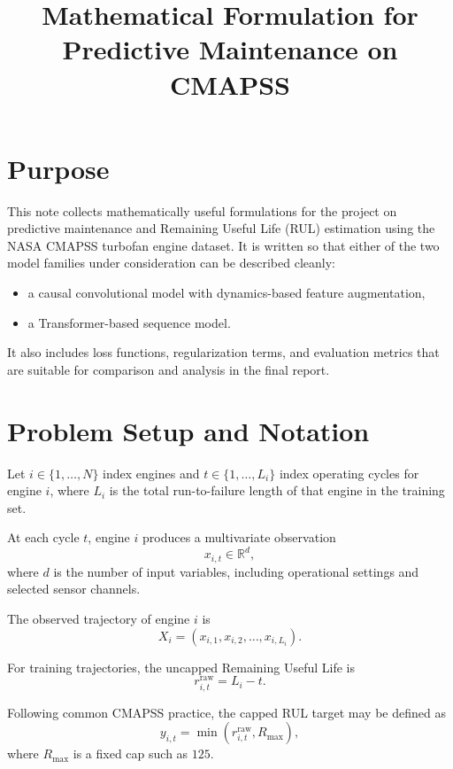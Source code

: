 \documentclass[11pt,a4paper]{article}
\title{Mathematical Formulation for Predictive Maintenance on CMAPSS}
\author{}
\date{}
\begin{document}
\maketitle

\section{Purpose}
This note collects mathematically useful formulations for the project on predictive maintenance and Remaining Useful Life (RUL) estimation using the NASA CMAPSS turbofan engine dataset. It is written so that either of the two model families under consideration can be described cleanly:
\begin{itemize}
    \item a causal convolutional model with dynamics-based feature augmentation,
    \item a Transformer-based sequence model.
\end{itemize}

It also includes loss functions, regularization terms, and evaluation metrics that are suitable for comparison and analysis in the final report.

\section{Problem Setup and Notation}
Let $i \in \{1,\dots,N\}$ index engines and $t \in \{1,\dots,L_i\}$ index operating cycles for engine $i$, where $L_i$ is the total run-to-failure length of that engine in the training set.

At each cycle $t$, engine $i$ produces a multivariate observation
\begin{equation}
    x_{i,t} \in \mathbb{R}^{d},
\end{equation}
where $d$ is the number of input variables, including operational settings and selected sensor channels.

The observed trajectory of engine $i$ is
\begin{equation}
    X_i = (x_{i,1}, x_{i,2}, \dots, x_{i,L_i}).
\end{equation}

For training trajectories, the uncapped Remaining Useful Life is
\begin{equation}
    r_{i,t}^{\mathrm{raw}} = L_i - t.
\end{equation}

Following common CMAPSS practice, the capped RUL target may be defined as
\begin{equation}
    y_{i,t} = \min(r_{i,t}^{\mathrm{raw}}, R_{\max}),
\end{equation}
where $R_{\max}$ is a fixed cap such as $125$.
\end{document}
